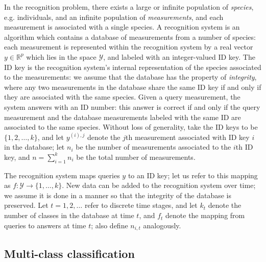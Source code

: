 \documentclass{article}
\begin{document}
In the recognition problem, there exists a large or infinite population of \emph{species}, e.g. individuals,
and an infinite population of \emph{measurements}, and each measurement is associated with a single species.
A recognition system is an algorithm which contains a database of measurements from a number of species:
each measurement is represented within the recognition system by a real vector $y \in \mathbb{R}^p$ which lies in the space $\mathcal{Y}$, and labeled with an integer-valued ID key.
The ID key is the recognition system's internal representation of the species associated to the measurements:
we assume that the database has the property of \emph{integrity}, where any two measurements in the database share the same ID key if and only if they are associated with the same species.
Given a query measurement, the system answers with an ID number: this answer is correct
if and only if the query measurement and the database measurements labeled with the same ID are associated to the same species.
Without loss of generality, take the ID keys to be $\{1,2,\hdots, k\}$, and let $y^{(i), j}$ denote the $j$th measurement associated with ID key $i$ in the database; let $n_i$ be the number of measurements associated to the $i$th ID key,
and $n = \sum_{i=1}^k n_i$ be the total number of measurements.

The recognition system maps queries $y$ to an ID key; let us refer to this mapping as $f:\mathcal{Y} \to \{1,\hdots, k\}$.
New data can be added to the recognition system over time; we assume it is done in a manner so that the integrity of the database is preserved.  Let $t = 1, 2 ,\hdots$ refer to discrete time stages,
and let $k_t$ denote the number of classes in the database at time $t$, and $f_t$ denote the mapping from queries to answers
at time $t$; also define $n_{i, t}$ analogously. 

\subsection{Multi-class classification}
\end{document}
